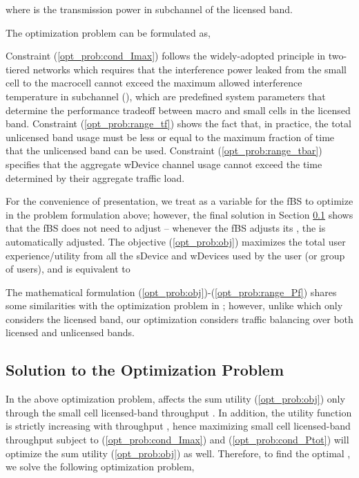 \documentclass[journal,final,letterpaper,10pt,doublecolumn,twoside]{IEEEtran}
\begin{document}
where  is the transmission power in subchannel  of the
licensed band.







The optimization problem can be formulated as,

Constraint (\ref{opt_prob:cond_Imax}) follows the widely-adopted
principle \cite{femto-PowerControl-2010Sundeep} in two-tiered
networks which requires that the interference power leaked from the
small cell to the macrocell cannot exceed the maximum allowed
interference temperature   in subchannel  (), which are predefined system parameters that determine
the performance tradeoff between macro and small cells in the
licensed band. Constraint (\ref{opt_prob:range_tf}) shows the fact
that, in practice, the total unlicensed band usage must be less or
equal to the maximum fraction of time  that the unlicensed
band can be used.  Constraint
(\ref{opt_prob:range_tbar}) specifies that the aggregate wDevice channel usage cannot
exceed the time determined by their aggregate traffic load.


For the convenience of presentation, we treat  as a variable for the fBS to optimize in the problem formulation above;  however, the final solution in Section \ref{sec:opt_solution} shows that the fBS does not need to adjust  -- whenever the fBS adjusts its ,  the  is automatically adjusted.
The objective (\ref{opt_prob:obj}) maximizes the total user experience/utility from all the sDevice and wDevices used by the user (or group of users), and is equivalent to 

The mathematical formulation (\ref{opt_prob:obj})-(\ref{opt_prob:range_Pf}) shares some similarities with the optimization problem in \cite{femto-PowerControl-2010Sundeep}; however, unlike \cite{femto-PowerControl-2010Sundeep} which only considers the licensed band, our optimization considers traffic balancing over both licensed and unlicensed bands.




\subsection{Solution to the Optimization Problem} \label{sec:opt_solution}
In the above optimization problem,  affects the sum
utility (\ref{opt_prob:obj}) only through the  small cell
licensed-band throughput  . In
addition,  the utility function  is strictly increasing
with throughput , hence maximizing  small cell  licensed-band
throughput   subject to
(\ref{opt_prob:cond_Imax}) and (\ref{opt_prob:cond_Ptot}) will
optimize the sum utility (\ref{opt_prob:obj}) as well. Therefore, to
find the optimal , we solve the following optimization
problem,
\end{document}
